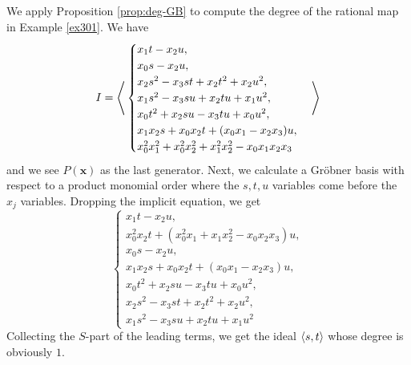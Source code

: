 \documentclass[fleqn,reqno]{amsart}
\begin{document}
\begin{example}[$\mt{ex314}$]
\label{ex314}
We apply Proposition \ref{prop:deg-GB} to compute the degree of the rational map
in Example \ref{ex301}.
We have
\[
	I=\Bigg\langle
	\begin{cases}
		{x}_{1} t-{x}_{2} u,\\{x}_{0} s-{x}_{2} u,\\{x}_{2} s^{2}-{x}_{3} s t+{x}_{2}
	     t^{2}+{x}_{2} u^{2},\\{x}_{1} s^{2}-{x}_{3} s u+{x}_{2} t u+{x}_{1} u^{2},\\{x}_{0}
	     t^{2}+{x}_{2} s u-{x}_{3} t u+{x}_{0} u^{2},\\{x}_{1} {x}_{2} s+{x}_{0} {x}_{2}
	     t+({x}_{0} {x}_{1}-{x}_{2} {x}_{3}) u,\\{x}_{0}^{2} {x}_{1}^{2}+{x}_{0}^{2}
	     {x}_{2}^{2}+{x}_{1}^{2} {x}_{2}^{2}-{x}_{0} {x}_{1} {x}_{2} {x}_{3}
	\end{cases}\Bigg\rangle
\]
and we see $P(\mathbf x)$ as the last generator.
Next, we calculate a Gr\"obner basis with respect to a product monomial order where
the $s,t,u$ variables come before the $x_j$ variables.
Dropping the implicit equation, we get
\[
	\begin{cases}
		{x}_{1} t-{x}_{2} u,\\{x}_{0}^{2}
	      {x}_{2} t+({x}_{0}^{2} {x}_{1}+{x}_{1} {x}_{2}^{2}-{x}_{0} {x}_{2} {x}_{3})
	      u,\\{x}_{0} s-{x}_{2} u,\\{x}_{1} {x}_{2} s+{x}_{0} {x}_{2} t+({x}_{0}
	      {x}_{1}-{x}_{2} {x}_{3}) u,\\{x}_{0} t^{2}+{x}_{2} s u-{x}_{3} t u+{x}_{0}
	      u^{2},\\{x}_{2} s^{2}-{x}_{3} s t+{x}_{2} t^{2}+{x}_{2} u^{2},\\{x}_{1}
	      s^{2}-{x}_{3} s u+{x}_{2} t u+{x}_{1} u^{2}
	\end{cases}
\]
Collecting the $S$-part of the leading terms, we get the ideal $\langle s,t\rangle$ whose degree
is obviously $1$.


\end{example}
\end{document}
